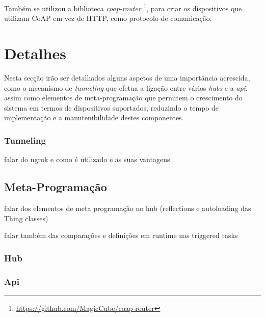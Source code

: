 Também se utilizou a biblioteca \textit{coap-router} \footnote{\url{https://github.com/MagicCube/coap-router}}, para criar os dispositivos que utilizam CoAP em vez de HTTP, como protocolo de comunicação.

\section{Detalhes}

Nesta secção irão ser detalhados alguns aspetos de uma importância acrescida, como o mecanismo de \textit{tunneling} que efetua a ligação entre vários \textit{hubs} e a \textit{api}, assim como elementos de meta-programação que permitem o crescimento do sistema em termos de dispositivos suportados, reduzindo o tempo de implementação e a manutenibilidade destes componentes.

\subsubsection{Tunneling}

falar do ngrok e como é utilizado e as suas vantagens

\subsection{Meta-Programação}

falar dos elementos de meta programação no hub (reflections e autoloading das Thing classes)

falar também das comparações e definições em runtime nas triggered tasks

\subsubsection{Hub}

\subsubsection{Api}
